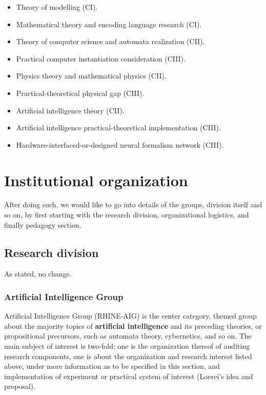 \documentclass[9pt,a4paper]{article}
\begin{document}
\begin{itemize}[topsep=0pt,itemsep=1pt]
    \item Theory of modelling (CI).
    \item Mathematical theory and encoding language research (CI).
    \item Theory of computer science and automata realization (CII).
    \item Practical computer instantiation consideration (CIII).
    \item Physics theory and mathematical physics (CII).
    \item Practical-theoretical physical gap (CIII).
    \item Artificial intelligence theory (CII).
    \item Artificial intelligence practical-theoretical implementation (CIII).
    \item Hardware-interfaced-or-designed neural formalism network (CIII).
\end{itemize}


\clearpage

\section{Institutional organization}

After doing such, we would like to go into details of the groups, division itself and so on, by first starting with the research division, organizational logistics, and finally pedagogy section. 

\subsection{Research division}

As stated, no change. 

\subsubsection{Artificial Intelligence Group}

Artificial Intelligence Group (RHINE-AIG) is the center category, themed group about the majority topics of \textbf{artificial intelligence} and its preceding theories, or propositional precursors, such as automata theory, cybernetics, and so on. The main subject of interest is two-fold: one is the organization thereof of auditing research components, one is about the organization and research interest listed above, under more information as to be specified in this section, and implementation of experiment or practical system of interest (Loerei's idea and proposal). 
\end{document}
